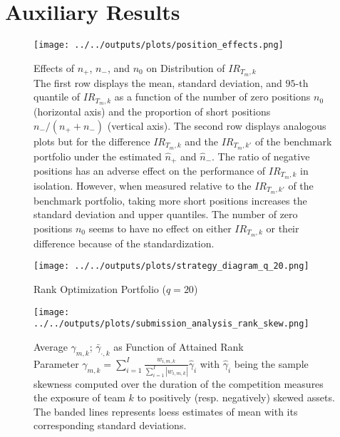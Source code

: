 \documentclass[3p,times,twocolumn]{elsarticle}
\begin{document}
\section{Auxiliary Results}\label{appendix:auxiliary_results}

\begin{figure}[!htbp]
    \centering
    \texttt{[image: ../../outputs/plots/position\_effects.png]}
    \caption{Effects of $n_{+}$, $n_{-}$, and $n_{0}$ on Distribution of $IR_{T_{m},k}$\\
    \footnotesize
    The first row displays the mean, standard deviation, and $95$-th quantile of $IR_{T_{m},k}$ as a function of the number of zero positions $n_{0}$ (horizontal axis) and the proportion of short positions $n_{-}/(n_{+}+n_{-})$ (vertical axis).
    The second row displays analogous plots but for the difference $IR_{T_{m},k}$ and the $IR_{T_{m},k'}$ of the benchmark portfolio under the estimated $\hat{n}_{+}$ and $\hat{n}_{-}$.
    The ratio of negative positions has an adverse effect on the performance of $IR_{T_{m},k}$ in isolation.
    However, when measured relative to the $IR_{T_{m},k'}$ of the benchmark portfolio, taking more short positions increases the standard deviation and upper quantiles.
    The number of zero positions $n_{0}$ seems to have no effect on either $IR_{T_{m},k}$ or their difference because of the standardization.
    }
    \label{fig:position_effects}
\end{figure}

\begin{figure}[!htbp]
    \centering
    \texttt{[image: ../../outputs/plots/strategy\_diagram\_q\_20.png]}
    \caption{Rank Optimization Portfolio ($q=20$)\\
        \footnotesize
    }
    \label{fig:strategy_diagram_q_20}
\end{figure}

\begin{figure}[!htbp]
    \centering
    \texttt{[image: ../../outputs/plots/submission\_analysis\_rank\_skew.png]}
    \caption{Average $\gamma_{m,k}$; $\bar{\gamma}_{\cdot,k}$ as Function of Attained Rank\\
        Parameter $\gamma_{m,k}=\sum_{i = 1}^{I} \frac{w_{i,m,k}}{\sum_{i = 1}^{I}|w_{i,m,k}|}\widehat{\gamma}_{i}$ with $\widehat{\gamma}_{i}$ being the sample skewness computed over the duration of the competition  measures the exposure of team $k$ to positively (resp. negatively) skewed assets.
        The banded lines represents loess estimates of mean with its corresponding standard deviations.
    }
    \label{fig:submission_analysis_rank_skew}
\end{figure}
\end{document}
